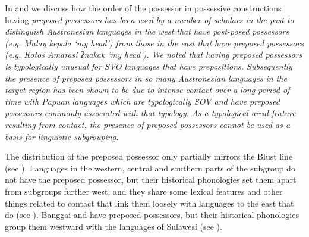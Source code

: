 In 
and  we discuss how the order of the possessor
in possessive constructions having \it{preposed possessors} has
been used by a number of scholars in the past to distinguish
Austronesian languages in the west that have post-posed possessors (e.g.
Malay \it{kepala } ‘my head’) from those in the east
that have preposed possessors (e.g.
Kotos Amarasi \it{ ʔnakak} ‘my head’).
We noted that having preposed possessors is typologically unusual
for SVO languages that have prepositions.
Subsequently the presence of preposed possessors in so many Austronesian
languages in the target region has been shown to be due to intense
contact over a long period of time with Papuan languages which
are typologically SOV and have preposed possessors commonly associated with that typology.
As a typological areal feature resulting from contact,
the presence of preposed possessors cannot be used as a basis for linguistic subgrouping.

The distribution of the preposed possessor only partially mirrors
the Blust line (see ).
Languages in the western,
central and southern parts of the  subgroup
do not have the preposed possessor,
but their historical phonologies set them apart from subgroups
further west, and they share some lexical features
and other things related to contact that link them loosely with
languages to the east that do (see ).
Banggai and  have preposed possessors,
but their historical phonologies group them westward with the
 languages of Sulawesi (see ).
